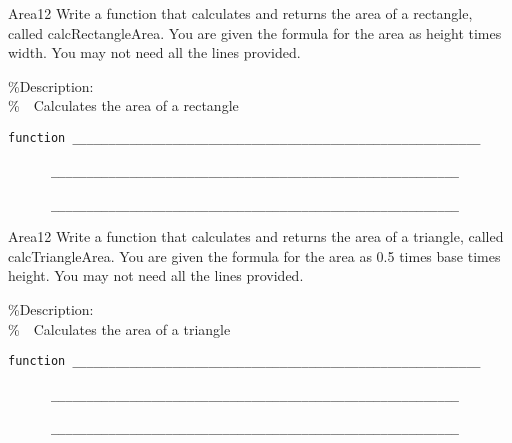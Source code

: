 \documentclass[master]{exam}
\begin{document}
\begin{problem}{Area}{12}
    \label{ca} Write a function that
    calculates and returns the area of
    a rectangle,
    called calcRectangleArea. You
    are given the formula for the area as height times width. You may not
    need all the lines provided.

   
    \%Description:\\
    \%\ \ Calculates the area of a rectangle
    \begin{verbatim}function _________________________________________________________

      _________________________________________________________

      _________________________________________________________
    \end{verbatim}
\end{problem}


\begin{problem}{Area}{12}
    \label{ca} Write a function that
    calculates and returns the area of
    a triangle,
    called calcTriangleArea. You
    are given the formula for the area as 0.5 times base times height. You may not
    need all the lines provided.

    \%Description:\\
    \%\ \ Calculates the area of a triangle
    \begin{verbatim}function _________________________________________________________

      _________________________________________________________

      _________________________________________________________
    \end{verbatim}
\end{problem}
\end{document}
